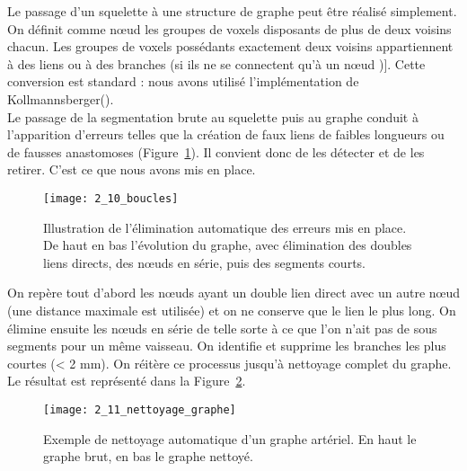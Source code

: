 Le passage d’un squelette à une structure de graphe peut être réalisé simplement. On définit comme nœud les groupes de voxels disposants de plus de deux voisins chacun. Les groupes de voxels possédants exactement deux voisins appartiennent à des liens ou à des branches (si ils ne se connectent qu’à un nœud \cite{Kerschnitzki2013})]. Cette conversion est standard : nous avons utilisé l’implémentation de Kollmannsberger(\cite{Kerschnitzki2013}). \\
Le passage de la segmentation brute au squelette puis au graphe conduit à l’apparition d’erreurs telles que la création de faux liens de faibles longueurs ou de fausses anastomoses (Figure~\ref{fig:2_10_boucles}). Il convient donc de les détecter et de les retirer. C’est ce que nous avons mis en place.
\begin{figure}[!t]
\centering
\texttt{[image: 2\_10\_boucles]}
\caption{Illustration de l'élimination automatique des erreurs mis en place. De haut en bas l’évolution du graphe, avec élimination des doubles liens directs, des nœuds en série, puis des segments courts.}
\label{fig:2_10_boucles}	
\end{figure}	
On repère tout d’abord les nœuds ayant un double lien direct avec un autre nœud (une distance maximale est utilisée) et on ne conserve que le lien le plus long. On élimine ensuite les nœuds en série de telle sorte à ce que l’on n’ait pas de sous segments pour un même vaisseau. On identifie et supprime les branches les plus courtes (< 2 mm). On réitère ce processus jusqu’à nettoyage complet du graphe. Le résultat est représenté dans la Figure~\ref{fig:2_11_nettoyage_graphe}.\\
\begin{figure}[!t]
\centering
\texttt{[image: 2\_11\_nettoyage\_graphe]}
\caption{Exemple de nettoyage automatique d'un graphe artériel. En haut le graphe brut, en bas le graphe nettoyé.}
\label{fig:2_11_nettoyage_graphe}	
\end{figure}	

